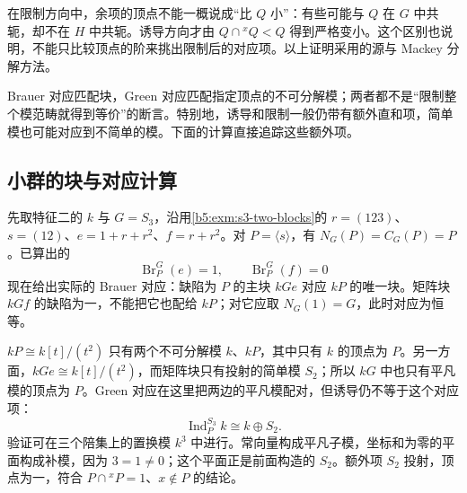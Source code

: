 在限制方向中，余项的顶点不能一概说成“比 \(Q\) 小”：有些可能与 \(Q\) 在 \(G\) 中共轭，却不在 \(H\) 中共轭。诱导方向才由 \(Q\cap{}^xQ<Q\) 得到严格变小。这个区别也说明，不能只比较顶点的阶来挑出限制后的对应项。以上证明采用\cite[Theorem 11.6.4]{Webb2016FiniteGroupRepresentations}的源与 Mackey 分解方法。

\ProseParagraphBreak

Brauer 对应匹配块，Green 对应匹配指定顶点的不可分解模；两者都不是“限制整个模范畴就得到等价”的断言。特别地，诱导和限制一般仍带有额外直和项，简单模也可能对应到不简单的模。下面的计算直接追踪这些额外项。

\subsection{小群的块与对应计算}
\label{b5:subsec:0806:04}

先取特征二的 \(k\) 与 \(G=S_3\)，沿用\cref{b5:exm:s3-two-blocks}的 \(r=(123)\)、\(s=(12)\)、\(e=1+r+r^2\)、\(f=r+r^2\)。对 \(P=\langle s\rangle\)，有 \(N_G(P)=C_G(P)=P\)。已算出的
\[
	\operatorname{Br}_P^G(e)=1,\qquad \operatorname{Br}_P^G(f)=0
\]
现在给出实际的 Brauer 对应：缺陷为 \(P\) 的主块 \(kGe\) 对应 \(kP\) 的唯一块。矩阵块 \(kGf\) 的缺陷为一，不能把它也配给 \(kP\)；对它应取 \(N_G(1)=G\)，此时对应为恒等。

\ProseParagraphBreak

\(kP\cong k[t]/(t^2)\) 只有两个不可分解模 \(k\)、\(kP\)，其中只有 \(k\) 的顶点为 \(P\)。另一方面，\(kGe\cong k[t]/(t^2)\)，而矩阵块只有投射的简单模 \(S_2\)；所以 \(kG\) 中也只有平凡模的顶点为 \(P\)。Green 对应在这里把两边的平凡模配对，但诱导仍不等于这个对应项：
\[
	\operatorname{Ind}_P^{S_3}k\cong k\oplus S_2.
\]
验证可在三个陪集上的置换模 \(k^3\) 中进行。常向量构成平凡子模，坐标和为零的平面构成补模，因为 \(3=1\ne0\)；这个平面正是前面构造的 \(S_2\)。额外项 \(S_2\) 投射，顶点为一，符合 \(P\cap{}^xP=1\)、\(x\notin P\) 的结论。

